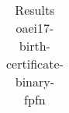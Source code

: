 \begin{table}[htb]
{\begin{tabular}[tb]{llllllllllllllllllllllllllllllllllllllll}
\end{tabular}

}

\caption{Results oaei17-birth-certificate-binary-fpfn}

\label{tbl:results}

\end{table}